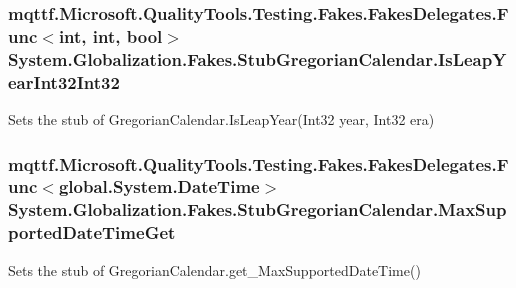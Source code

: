 \hypertarget{class_system_1_1_globalization_1_1_fakes_1_1_stub_gregorian_calendar_aa17f6553f942511f3205dcbdfc0fee5b}{
\subsubsection[{Is\-Leap\-Year\-Int32\-Int32}]{\setlength{\rightskip}{0pt plus 5cm}mqttf.\-Microsoft.\-Quality\-Tools.\-Testing.\-Fakes.\-Fakes\-Delegates.\-Func$<$int, int, bool$>$ System.\-Globalization.\-Fakes.\-Stub\-Gregorian\-Calendar.\-Is\-Leap\-Year\-Int32\-Int32}}\label{class_system_1_1_globalization_1_1_fakes_1_1_stub_gregorian_calendar_aa17f6553f942511f3205dcbdfc0fee5b}


Sets the stub of Gregorian\-Calendar.\-Is\-Leap\-Year(\-Int32 year, Int32 era)

\hypertarget{class_system_1_1_globalization_1_1_fakes_1_1_stub_gregorian_calendar_a23dd26209f346485912c6c6e933c44c7}{
\subsubsection[{Max\-Supported\-Date\-Time\-Get}]{\setlength{\rightskip}{0pt plus 5cm}mqttf.\-Microsoft.\-Quality\-Tools.\-Testing.\-Fakes.\-Fakes\-Delegates.\-Func$<$global.\-System.\-Date\-Time$>$ System.\-Globalization.\-Fakes.\-Stub\-Gregorian\-Calendar.\-Max\-Supported\-Date\-Time\-Get}}\label{class_system_1_1_globalization_1_1_fakes_1_1_stub_gregorian_calendar_a23dd26209f346485912c6c6e933c44c7}


Sets the stub of Gregorian\-Calendar.\-get\-\_\-\-Max\-Supported\-Date\-Time()

